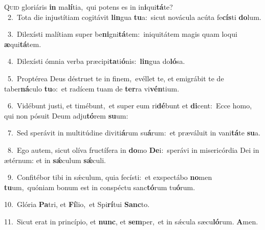 \lettrine{\initial\textcolor{\initialcolor}{Q}}{uid} gloriáris \textbf{in} ma\-\textbf{lí}\-tia,~\star qui potens es in in\-\textbf{i}\-qui\-\textbf{tá}\-te?\\
{\numbfont\textcolor{\numbcolor}{~2.}}~Tota die injustítiam cogitávit \textbf{lin}\-gua \textbf{tu}\-a:~\star sicut novácula acúta fe\-\textbf{cís}\-ti \textbf{do}\-lum.\par
{\numbfont\textcolor{\numbcolor}{~3.}}~Dilexísti malítiam super be\-\textbf{ni}\-gni\-\textbf{tá}\-tem:~\star iniquitátem magis quam loqui \textbf{æ}\-qui\-\textbf{tá}\-tem.\par
{\numbfont\textcolor{\numbcolor}{~4.}}~Dilexísti ómnia verba præcipi\-\textbf{ta}\-ti\-\textbf{ó}\-nis:~\star \textbf{lin}\-gua do\-\textbf{ló}\-sa.\par
{\numbfont\textcolor{\numbcolor}{~5.}}~Proptérea Deus déstruet te in finem,~\dagger evéllet te, et emigrábit te de taber\-\textbf{ná}\-culo \textbf{tu}\-o:~\star et radícem tuam de \textbf{ter}\-ra vi\-\textbf{vén}\-tium.\par
{\numbfont\textcolor{\numbcolor}{~6.}}~Vidébunt justi, et timébunt,~\dagger et super eum ri\-\textbf{dé}\-bunt et \textbf{di}\-cent:~\star Ecce homo, qui non pósuit Deum adju\-\textbf{tó}\-rem \textbf{su}\-um:\par
{\numbfont\textcolor{\numbcolor}{~7.}}~Sed sperávit in multitúdine diviti\-\textbf{á}\-rum su\-\textbf{á}\-rum:~\star et præváluit in vani\-\textbf{tá}\-te \textbf{su}\-a.\par
{\numbfont\textcolor{\numbcolor}{~8.}}~Ego autem, sicut olíva fructífera in \textbf{do}\-mo \textbf{De}\-i:~\star sperávi in misericórdia Dei in ætérnum: et in \textbf{sǽ}\-culum \textbf{sǽ}\-culi.\par
{\numbfont\textcolor{\numbcolor}{~9.}}~Confitébor tibi in sǽculum, quia fecísti:~\dagger et exspectábo \textbf{no}\-men \textbf{tu}\-um,~\star quóniam bonum est in conspéctu sanc\-\textbf{tó}\-rum tu\-\textbf{ó}\-rum.\par
{\numbfont\textcolor{\numbcolor}{10.}}~Glória \textbf{Pa}\-tri, et \textbf{Fí}\-lio,~\star et Spi\-\textbf{rí}\-tui \textbf{Sanc}\-to.\par
{\numbfont\textcolor{\numbcolor}{11.}}~Sicut erat in princípio, et \textbf{nunc}\-, et \textbf{sem}\-per,~\star et in sǽcula sæcu\-\textbf{ló}\-rum. \textbf{A}\-men.\par
